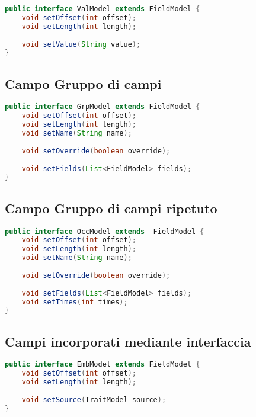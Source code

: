 \documentclass[a4paper,10pt]{report}
\begin{document}
\begin{lstlisting}[language=java, caption=interfaccia ValModel, 
label=code:ValModel]
public interface ValModel extends FieldModel {
    void setOffset(int offset);
    void setLength(int length);
    
    void setValue(String value);
}
\end{lstlisting}

\subsection{Campo Gruppo di campi}

\begin{lstlisting}[language=java, caption=interfaccia GrpModel, 
label=code:GrpModel]
public interface GrpModel extends FieldModel {
    void setOffset(int offset);
    void setLength(int length);
    void setName(String name);
    
    void setOverride(boolean override);
    
    void setFields(List<FieldModel> fields);
}
\end{lstlisting}

\subsection{Campo Gruppo di campi ripetuto}

\begin{lstlisting}[language=java, caption=interfaccia OccModel, 
label=code:OccModel]
public interface OccModel extends  FieldModel {
    void setOffset(int offset);
    void setLength(int length);
    void setName(String name);
    
    void setOverride(boolean override);
    
    void setFields(List<FieldModel> fields);
    void setTimes(int times);
}
\end{lstlisting}

\subsection{Campi incorporati mediante interfaccia}

\begin{lstlisting}[language=java, caption=interfaccia EmbModel, 
label=code:EmbModel]
public interface EmbModel extends FieldModel {
    void setOffset(int offset);
    void setLength(int length);
    
    void setSource(TraitModel source);
}
\end{lstlisting}
\end{document}
